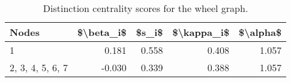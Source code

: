 \begin{table}
\centering
\caption{\label{tab:wheel}Distinction centrality scores for the wheel graph.}
\centering
\begin{tabular}[t]{lrrrr}
\toprule
Nodes & \$\textbackslash{}beta\_i\$ & \$s\_i\$ & \$\textbackslash{}kappa\_i\$ & \$\textbackslash{}alpha\$\\
\midrule
1 & 0.181 & 0.558 & 0.408 & 1.057\\
2, 3, 4, 5, 6, 7 & -0.030 & 0.339 & 0.388 & 1.057\\
\bottomrule
\end{tabular}
\end{table}
